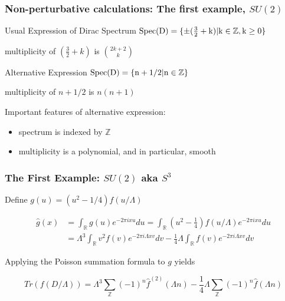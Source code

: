 \documentclass{beamer}
\def\Z{{\mathbb Z}}
\def\R{{\mathbb R}}
\begin{document}
\begin{frame}
  \frametitle{Non-perturbative calculations: The first example, $SU(2)$}
  \begin{block}{Usual Expression of Dirac Spectrum}
    $\rm{Spec}(D) = \{ \pm (\frac{3}{2} + k) | k \in \Z, k \geq 0\}$

    multiplicity of $(\frac{3}{2} + k)$ is $2 {k+2} \choose {k}$
  \end{block}

  \pause

  \begin{block}{Alternative Expression}
    $\rm{Spec}(D) = \{n + 1/2 | n \in \Z \}$

    multiplicity of $n + 1/2$ is $n(n+1)$
  \end{block}

  \pause

  \begin{block}{}
    Important features of alternative expression:
    \begin{itemize}
      \item spectrum is indexed by $\Z$
      \item multiplicity is a polynomial, and in particular, smooth
    \end{itemize}
  \end{block}
\end{frame}

\begin{frame}
  \frametitle{The First Example: $SU(2)$ aka $S^3$}
  \begin{block}{}
    Define $g(u) = (u^2 -1/4)f(u/\Lambda)$
  \end{block}

  \pause

  \begin{block}{}
    \begin{align*}
      \widehat{g}(x) &= \int_{\R}g(u) e^{-2 \pi i x u}du = \int_{\R}(u^2 - \frac{1}{4})f(u/\Lambda)e^{-2 \pi i x u}du \\
      &= \Lambda ^3 \int_{\R}v^2 f(v) e^{-2\pi i \Lambda x v}dv - \frac{1}{4} \Lambda \int_{\R}f(v)e^{-2\pi i \Lambda xv}dv
    \end{align*}
  \end{block}

  \pause

  \begin{block}{}
    Applying the Poisson summation formula to $g$ yields

    \[
      Tr(f(D/\Lambda)) = \Lambda^3 \sum_{\Z}(-1)^n \widehat{f}^{(2)}(\Lambda n) - \frac{1}{4} \Lambda \sum_{\Z}(-1)^n \widehat{f}(\Lambda n)
    \]
  \end{block}
\end{frame}
\end{document}
